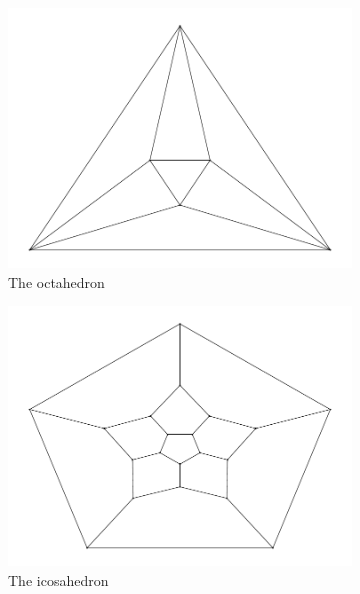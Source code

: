 \documentclass[12pt]{article}
\begin{document}
\begin{figure}[H]
\begin{subfigure}[b]{0.3\textwidth}
          \centering 
          \includegraphics[width = \textwidth]{../output/Q1-platonic-8.pdf}
          \caption{The octahedron}
      \end{subfigure}
      \hfill
      \begin{subfigure}[b]{0.3\textwidth}
          \centering 
          \includegraphics[width = \textwidth]{../output/Q1-platonic-12.pdf}
          \caption{The icosahedron}
      \end{subfigure}
      \hfill
      \begin{subfigure}[b]{0.3\textwidth}
          \centering 

\end{subfigure}
\end{figure}
\end{document}
